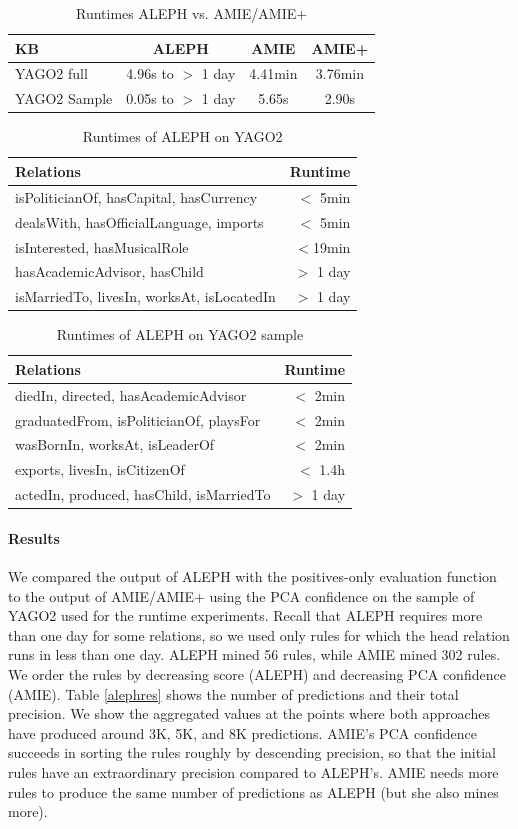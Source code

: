 \begin{table}
\begin{tabular}{l|ccc}
KB & ALEPH & AMIE & AMIE+\\
\hline
YAGO2 full & 4.96s to $>$ 1 day & 4.41min & 3.76min\\
YAGO2 Sample & 0.05s to $>$ 1 day & 5.65s & 2.90s \\
\end{tabular}
\caption{Runtimes ALEPH vs. AMIE/AMIE+}
\label{alephrun0}
\end{table}
\begin{table}[t]
 \begin{tabular}{l|r}
Relations & Runtime\\
\hline
isPoliticianOf, hasCapital, hasCurrency & $<$ 5min\\
dealsWith, hasOfficialLanguage, imports & $<$ 5min\\
isInterested, hasMusicalRole & $<$19min\\
hasAcademicAdvisor, hasChild& $>$ 1 day\\
isMarriedTo, livesIn, worksAt, isLocatedIn& $>$ 1 day\\ %
\end{tabular}
\caption{Runtimes of ALEPH on YAGO2}
\label{alephrun1}
\end{table}
\begin{table}[t]
\begin{tabular}{l|r}
Relations & Runtime\\
\hline
diedIn, directed, hasAcademicAdvisor & $<$ 2min\\
graduatedFrom, isPoliticianOf, playsFor & $<$ 2min\\
wasBornIn, worksAt, isLeaderOf &  $<$ 2min\\
exports, livesIn, isCitizenOf & $<$ 1.4h\\
actedIn, produced, hasChild, isMarriedTo & $>$ 1 day\\ %
\end{tabular}
\caption{Runtimes of ALEPH on YAGO2 sample}
\label{alephrun2}
\end{table}

\paragraph{Results}
We compared the output of ALEPH with the positives-only evaluation function to the output of AMIE/AMIE+ using the PCA
confidence on the sample of YAGO2 used for the runtime experiments.
Recall that ALEPH requires more than one day for some relations, so we used only rules for which the head
relation runs in less than one day.
ALEPH mined 56 rules, while AMIE mined 302 rules.
We order the rules by decreasing score (ALEPH) and decreasing PCA confidence (AMIE).
Table \ref{alephres} shows the number of predictions and their total precision.
We show the aggregated values at the points where both approaches have produced around 3K, 5K, and 8K predictions.
AMIE's PCA confidence succeeds in sorting the rules roughly by descending precision, so that the initial rules have an extraordinary precision 
compared to ALEPH's.
AMIE needs more rules to produce the same number of predictions as ALEPH (but she also mines more).

